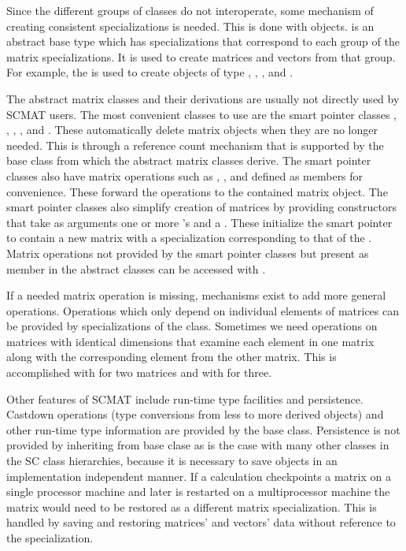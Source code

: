 Since the different groups of classes do not interoperate, some mechanism
of creating consistent specializations is needed.  This is done with
 objects.   is an abstract base
type which has specializations that correspond to each group of the matrix
specializations.  It is used to create matrices and vectors from that
group.  For example, the  is used to create
objects of type , ,
, and .

The abstract matrix classes and their derivations are usually not directly
used by SCMAT users.  The most convenient classes to use are the smart
pointer classes , ,
, , and
.  These automatically delete matrix objects when
they are no longer needed.  This is through a reference count mechanism
that is supported by the  base class from which the
abstract matrix classes derive.  The smart pointer classes also have matrix
operations such as , , and
 defined as members for convenience.  These forward the
operations to the contained matrix object.  The smart pointer classes also
simplify creation of matrices by providing constructors that take as
arguments one or more 's and a
.  These initialize the smart pointer to contain a
new matrix with a specialization corresponding to that of the
.  Matrix operations not provided by the smart
pointer classes but present as member in the abstract classes can be
accessed with .

If a needed matrix operation is missing, mechanisms exist to add more
general operations.  Operations which only depend on individual elements of
matrices can be provided by specializations of the 
class.  Sometimes we need operations on matrices with identical dimensions
that examine each element in one matrix along with the corresponding
element from the other matrix.  This is accomplished with
 for two matrices and with 
for three.

Other features of SCMAT include run-time type facilities and persistence.
Castdown operations (type conversions from less to more derived objects)
and other run-time type information are provided by the
 base class.  Persistence is not provided by
inheriting from  base clase as is the case with many
other classes in the SC class hierarchies, because it is necessary to save
objects in an implementation independent manner.  If a calculation
checkpoints a matrix on a single processor machine and later is restarted
on a multiprocessor machine the matrix would need to be restored as a
different matrix specialization.  This is handled by saving and restoring
matrices' and vectors' data without reference to the specialization.

